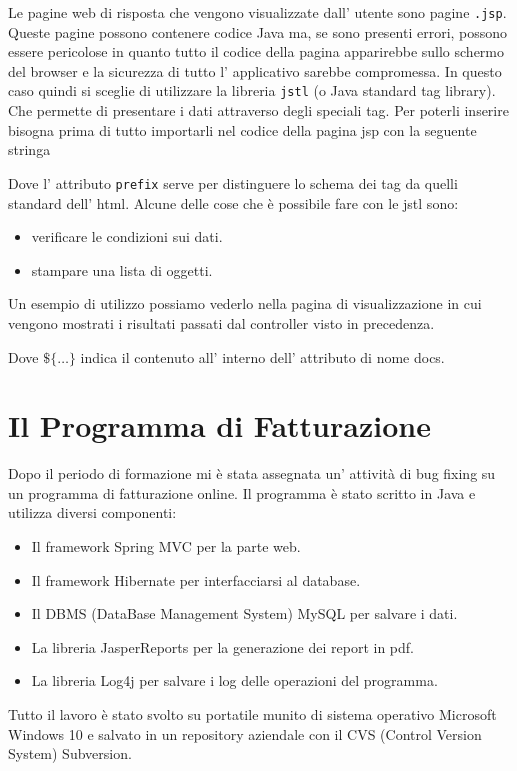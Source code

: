 \documentclass[12pt]{book}
\begin{document}
Le pagine web di risposta che vengono visualizzate dall' utente sono pagine 
\texttt{.jsp}. Queste pagine possono contenere codice Java ma, se sono 
presenti errori, possono essere pericolose in quanto tutto il codice della 
pagina apparirebbe sullo schermo del browser e la sicurezza di tutto l' applicativo 
sarebbe compromessa.
In questo caso quindi si sceglie di utilizzare la libreria \texttt{jstl} (o Java
standard tag library). Che permette di presentare i dati attraverso degli 
speciali tag.
Per poterli inserire bisogna prima di tutto importarli nel codice della
pagina jsp con la seguente stringa 

Dove l' attributo \texttt{prefix} serve per distinguere lo schema dei tag da quelli 
standard dell' html.
Alcune delle cose che è possibile fare con le jstl sono:
\begin{itemize}
    \item verificare le condizioni sui dati.
    \item stampare una lista di oggetti. 
\end{itemize}
Un esempio di utilizzo possiamo vederlo nella pagina di visualizzazione 
in cui vengono mostrati i risultati passati dal controller visto in precedenza.

Dove \texttt{\(\$\{\dots\}\)} indica il contenuto all' interno dell' attributo
di nome docs.
\chapter{Il Programma di Fatturazione}
Dopo il periodo di formazione mi è stata assegnata un' attività di bug fixing 
su un programma di fatturazione online.
Il programma è stato scritto in Java e utilizza diversi componenti:
\begin{itemize}
    \item Il framework Spring MVC per la parte web.
    \item Il framework Hibernate per interfacciarsi al database.
    \item Il DBMS (DataBase Management System) MySQL per salvare i dati.
    \item La libreria JasperReports per la generazione dei report in pdf.
    \item La libreria Log4j per salvare i log delle operazioni del programma.
\end{itemize}
Tutto il lavoro è stato svolto su portatile munito di sistema operativo Microsoft
Windows 10 e salvato in un repository aziendale con il CVS (Control Version 
System) Subversion\@.
\end{document}
